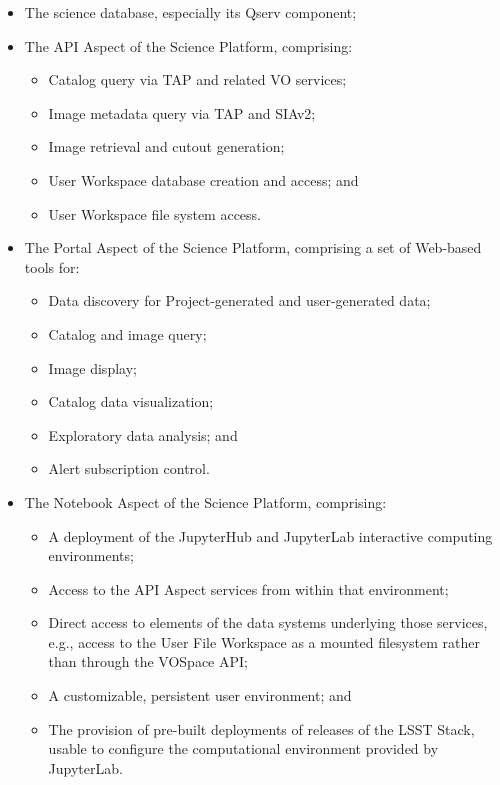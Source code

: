 \documentclass[DM,STS,toc]{lsstdoc}
\begin{document}
\begin{itemize}

  \item{The science database, especially its Qserv component;}
  \item{The API Aspect of the Science Platform, comprising:

    \begin{itemize}
      \item{Catalog query via TAP and related VO services;}
      \item{Image metadata query via TAP and SIAv2;}
      \item{Image retrieval and cutout generation;}
      \item{User Workspace database creation and access; and}
      \item{User Workspace file system access.}
    \end{itemize}
  }

  \item{The Portal Aspect of the Science Platform, comprising a set of Web-based tools for:

    \begin{itemize}
      \item{Data discovery for Project-generated and user-generated data;}
      \item{Catalog and image query;}
      \item{Image display;}
      \item{Catalog data visualization;}
      \item{Exploratory data analysis; and}
      \item{Alert subscription control.}
    \end{itemize}
  }

  \item{The Notebook Aspect of the Science Platform, comprising:

    \begin{itemize}
      \item{A deployment of the JupyterHub and JupyterLab interactive computing environments;}
      \item{Access to the API Aspect services from within that environment;}
      \item{Direct access to elements of the data systems underlying those services, e.g., access to the User File Workspace as a mounted filesystem rather than through the VOSpace API;}
      \item{A customizable, persistent user environment; and}
      \item{The provision of pre-built deployments of releases of the LSST Stack, usable to configure the computational environment provided by JupyterLab.}
    \end{itemize}

  }

\end{itemize}
\end{document}
